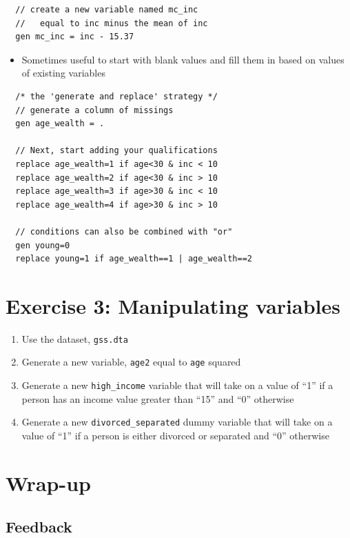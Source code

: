 \documentclass[]{book}
\providecommand{\tightlist}{%
  \setlength{\itemsep}{0pt}\setlength{\parskip}{0pt}}
\begin{document}
\begin{verbatim}
  // create a new variable named mc_inc
  //   equal to inc minus the mean of inc
  gen mc_inc = inc - 15.37  
\end{verbatim}

\begin{itemize}
\tightlist
\item
  Sometimes useful to start with blank values and fill them in based on
  values of existing variables
\end{itemize}

\begin{verbatim}
  /* the 'generate and replace' strategy */ 
  // generate a column of missings
  gen age_wealth = .

  // Next, start adding your qualifications
  replace age_wealth=1 if age<30 & inc < 10
  replace age_wealth=2 if age<30 & inc > 10
  replace age_wealth=3 if age>30 & inc < 10
  replace age_wealth=4 if age>30 & inc > 10

  // conditions can also be combined with "or"
  gen young=0
  replace young=1 if age_wealth==1 | age_wealth==2
\end{verbatim}

\section{Exercise 3: Manipulating
variables}\label{exercise-3-manipulating-variables}

\begin{enumerate}
\def\labelenumi{\arabic{enumi}.}
\tightlist
\item
  Use the dataset, \texttt{gss.dta}
\item
  Generate a new variable, \texttt{age2} equal to \texttt{age} squared
\item
  Generate a new \texttt{high\_income} variable that will take on a
  value of ``1'' if a person has an income value greater than ``15'' and
  ``0'' otherwise
\item
  Generate a new \texttt{divorced\_separated} dummy variable that will
  take on a value of ``1'' if a person is either divorced or separated
  and ``0'' otherwise
\end{enumerate}

\section{Wrap-up}\label{wrap-up-7}

\subsection{Feedback}\label{feedback-7}
\end{document}
